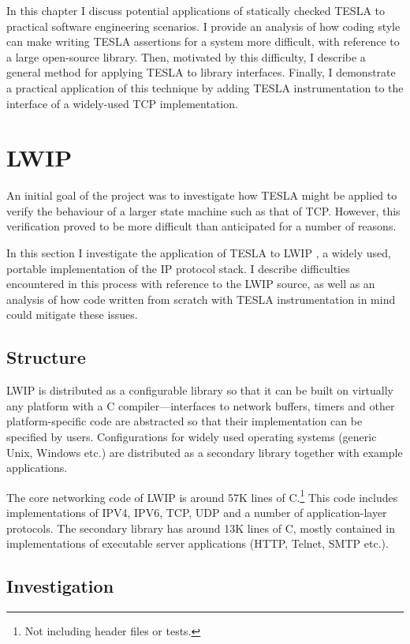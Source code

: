 In this chapter I discuss potential applications of statically checked TESLA to
practical software engineering scenarios. I provide an analysis of how coding
style can make writing TESLA assertions for a system more difficult, with
reference to a large open-source library. Then, motivated by this difficulty, I
describe a general method for applying TESLA to library interfaces. Finally, I
demonstrate a practical application of this technique by adding TESLA
instrumentation to the interface of a widely-used TCP implementation.

\section{LWIP} \label{sec:lwip}

An initial goal of the project was to investigate how TESLA might be
applied to verify the behaviour of a larger state machine such as that
of TCP. However, this verification proved to be more difficult than
anticipated for a number of reasons.

In this section I investigate the application of TESLA to LWIP
\cite{dunkels_design_2001}, a widely used, portable implementation of
the IP protocol stack. I describe difficulties encountered in this
process with reference to the LWIP source, as well as an analysis of how
code written from scratch with TESLA instrumentation in mind could
mitigate these issues.

\subsection{Structure}

LWIP is distributed as a configurable library so that it can be built on
virtually any platform with a C compiler---interfaces to network
buffers, timers and other platform-specific code are abstracted so that
their implementation can be specified by users. Configurations for
widely used operating systems (generic Unix, Windows etc.) are
distributed as a secondary library together with example applications.

The core networking code of LWIP is around 57K lines of C.\footnote{Not
including header files or tests.} This code includes implementations of
IPV4, IPV6, TCP, UDP and a number of application-layer protocols. The
secondary library has around 13K lines of C, mostly contained in
implementations of executable server applications (HTTP, Telnet, SMTP
etc.).

\subsection{Investigation}


